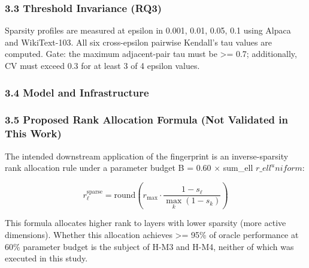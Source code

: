 \subsubsection{3.3 Threshold Invariance (RQ3)}

Sparsity profiles are measured at epsilon in {0.001, 0.01, 0.05, 0.1} using Alpaca and WikiText-103. All six cross-epsilon pairwise Kendall's tau values are computed. Gate: the maximum adjacent-pair tau must be >= 0.7; additionally, CV must exceed 0.3 for at least 3 of 4 epsilon values.

\subsubsection{3.4 Model and Infrastructure}

\begin{table}[htbp]
\centering
{}
\end{table}

\subsubsection{3.5 Proposed Rank Allocation Formula (Not Validated in This Work)}

The intended downstream application of the fingerprint is an inverse-sparsity rank allocation rule under a parameter budget B = 0.60 $\times$ sum\_ell $r\_ell^uniform$:

$$r_\ell^{\text{sparse}} = \text{round}\left(r_{\max} \cdot \frac{1 - s_\ell}{\max_k (1 - s_k)}\right)$$

This formula allocates higher rank to layers with lower sparsity (more active dimensions). Whether this allocation achieves >= 95\% of oracle performance at 60\% parameter budget is the subject of H-M3 and H-M4, neither of which was executed in this study.

